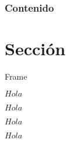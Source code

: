 

    \frame{\titlepage}
	\begin{frame}
		\frametitle{Contenido}
%		
%		
		\tableofcontents
	\end{frame}
    \section{Sección}
	\begin{frame}{Frame}
    \begin{mdefinition}[Hola]
        $Hola$
    \end{mdefinition}
    \begin{mtheorem}[Hola]
        $Hola$
    \end{mtheorem}
    \begin{axiom}[Hola]
        $Hola$
    \end{axiom}
    \begin{coll}[Hola]
        $Hola$
    \end{coll}
	\end{frame}

